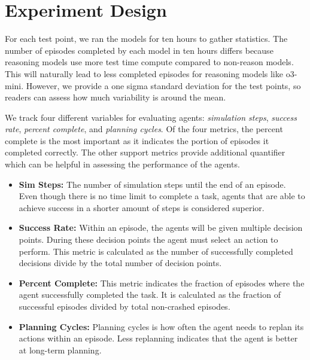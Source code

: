 \section{Experiment Design}

For each test point, we ran the models for ten hours to gather statistics.  The number of episodes completed by each model in ten hours differs because reasoning models use more test time compute compared to non-reason models.  This will naturally lead to less completed episodes for reasoning models like o3-mini.  However, we provide a one sigma standard deviation for the test points, so readers can assess how much variability is around the mean.

We track four different variables for evaluating agents: \textit{simulation steps}, \textit{success rate}, \textit{percent complete}, and \textit{planning cycles}.  Of the four metrics, the percent complete is the most important as it indicates the portion of episodes it completed correctly.  The other support metrics provide additional quantifier which can be helpful in assessing the performance of the agents.

\begin{itemize}
      \item \textbf{Sim Steps:}
            The number of simulation steps until the end of an episode.  Even though there is no time limit to complete a task, agents that are able to achieve success in a shorter amount of steps is considered superior.
      \item \textbf{Success Rate:}
            Within an episode, the agents will be given multiple decision points.  During these decision points the agent must select an action to perform.  This metric is calculated as the number of successfully completed decisions divide by the total number of decision points.
      \item \textbf{Percent Complete:}
            This metric indicates the fraction of episodes where the agent successfully completed the task.  It is calculated as the fraction of successful episodes divided by total non-crashed episodes.
      \item \textbf{Planning Cycles:}
            Planning cycles is how often the agent needs to replan its actions within an episode.  Less replanning indicates that the agent is better at long-term planning.
\end{itemize}

